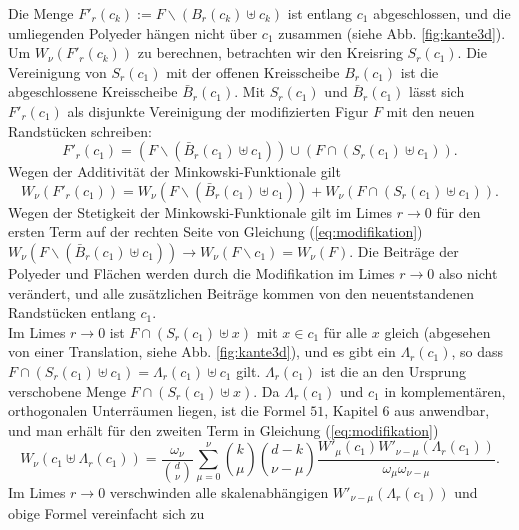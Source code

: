 Die Menge $F'_r(c_k):=F\backslash(B_r(c_k)\uplus c_k)$ ist entlang $c_1$ abgeschlossen, und die umliegenden Polyeder h\"angen nicht \"uber $c_1$ zusammen (siehe Abb. \ref{fig:kante3d}).  
\\Um $W_\nu(F'_r(c_k))$ zu berechnen, betrachten wir den Kreisring $S_r(c_1)$. Die Vereinigung von $S_r(c_1)$ mit der offenen Kreisscheibe $B_r(c_1)$ ist die abgeschlossene Kreisscheibe $\bar{B}_r(c_1)$.  Mit $S_r(c_1)$ und $\bar{B}_r(c_1)$ l\"asst sich $F'_r(c_1)$ als disjunkte Vereinigung der modifizierten Figur $F$ mit den neuen Randst\"ucken schreiben: 
\begin{equation}
  F'_r(c_1)=\left( F\backslash (\bar{B}_r(c_1) \uplus c_1)\right) \cup \left( F\cap (S_r(c_1)\uplus c_1)\right).
\end{equation}
Wegen der Additivit\"at der Minkowski-Funktionale gilt  
\begin{equation}
\label{eq:modifikation}
  W_\nu(F'_r(c_1))=W_\nu\left(F\backslash(\bar{B}_r(c_1)\uplus c_1)\right)+W_\nu\left(F\cap (S_r(c_1) \uplus c_1)\right).
\end{equation}
Wegen der Stetigkeit der Minkowski-Funktionale gilt im Limes $r \rightarrow 0$ f\"ur den ersten Term auf der rechten Seite von Gleichung (\ref{eq:modifikation}) $W_\nu(F\backslash(\bar{B}_r(c_1)\uplus c_1))\rightarrow W_\nu(F\backslash c_1)=W_\nu(F)$. Die Beitr\"age der Polyeder und Fl\"achen werden durch die Modifikation im Limes $r\rightarrow 0$ also nicht ver\"andert, und alle zus\"atzlichen Beitr\"age kommen von den neuentstandenen Randst\"ucken entlang $c_1$. 
\\Im Limes $r\rightarrow 0$ ist $F\cap (S_r(c_1)\uplus x)$ mit $x\in c_1$ f\"ur alle $x$ gleich (abgesehen von einer Translation, siehe Abb. \ref{fig:kante3d}), und es gibt ein $\Lambda_r(c_1)$, so dass $F\cap (S_r(c_1)\uplus c_1)=\Lambda_r(c_1)\uplus c_1$ gilt. $\Lambda_r(c_1)$ ist die an den Ursprung verschobene Menge $F\cap (S_r(c_1)\uplus x)$.
Da $\Lambda_r(c_1)$ und $c_1$ in komplement\"aren, orthogonalen Unterr\"aumen liegen, ist die Formel $51$, Kapitel $6$ aus \cite{Hadwinger:57} anwendbar, und man erh\"alt f\"ur den zweiten Term in Gleichung (\ref{eq:modifikation})
\begin{equation}
  \label{eq:hadwinger}
  W_{\nu}(c_1\uplus\Lambda_r(c_1))=\frac{\omega_{\nu}}{{d \choose \nu}}\sum_{\mu=0}^{\nu}{k\choose \mu}{d-k \choose \nu-\mu}\frac{W'_{\mu}(c_1)W'_{\nu-\mu}(\Lambda_r(c_1))}{\omega_{\mu}\omega_{\nu-\mu}}.
\end{equation}
Im Limes $r \rightarrow 0$ verschwinden alle skalenabh\"angigen  $W'_{\nu-\mu}(\Lambda_r(c_1))$ und obige Formel vereinfacht sich zu 
